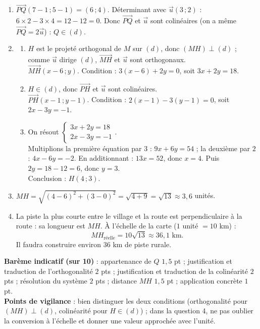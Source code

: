 \documentclass[11pt]{article}
\begin{document}
\begin{corrige}
\begin{enumerate}
\item $\overrightarrow{PQ}(7-1\,;5-1) = (6\,;4)$. Déterminant avec $\vec{u}(3\,;2)$ : $6\times 2 - 3\times 4 = 12-12 = 0$. Donc $\overrightarrow{PQ}$ et $\vec{u}$ sont colinéaires (on a même $\overrightarrow{PQ} = 2\vec{u}$) : $Q\in(d)$.
\item \begin{enumerate}
\item $H$ est le projeté orthogonal de $M$ sur $(d)$, donc $(MH)\perp(d)$ ; comme $\vec{u}$ dirige $(d)$, $\overrightarrow{MH}$ et $\vec{u}$ sont orthogonaux.\\
$\overrightarrow{MH}(x-6\,;y)$. Condition : $3(x-6)+2y = 0$, soit $3x+2y = 18$.
\item $H\in(d)$, donc $\overrightarrow{PH}$ et $\vec{u}$ sont colinéaires.\\
$\overrightarrow{PH}(x-1\,;y-1)$. Condition : $2(x-1)-3(y-1) = 0$, soit $2x-3y = -1$.
\item On résout $\begin{cases} 3x+2y = 18 \\ 2x-3y = -1 \end{cases}$.\\
Multiplions la première équation par $3$ : $9x+6y = 54$ ; la deuxième par $2$ : $4x-6y = -2$. En additionnant : $13x = 52$, donc $x = 4$. Puis $2y = 18-12 = 6$, donc $y = 3$.\\
Conclusion : $H(4\,;3)$.
\end{enumerate}
\item $MH = \sqrt{(4-6)^2+(3-0)^2} = \sqrt{4+9} = \sqrt{13} \approx 3,6$ unités.
\item La piste la plus courte entre le village et la route est perpendiculaire à la route : sa longueur est $MH$. À l'échelle de la carte ($1$ unité $= 10$ km) :
\[ MH_{\text{réelle}} = 10\sqrt{13} \approx 36,1 \text{ km.} \]
Il faudra construire environ $36$ km de piste rurale.
\end{enumerate}
\textbf{Barème indicatif (sur 10)} : appartenance de $Q$ $1,5$ pt ; justification et traduction de l'orthogonalité $2$ pts ; justification et traduction de la colinéarité $2$ pts ; résolution du système $2$ pts ; distance $MH$ $1,5$ pt ; application concrète $1$ pt.\\
\textbf{Points de vigilance} : bien distinguer les deux conditions (orthogonalité pour $(MH)\perp(d)$, colinéarité pour $H\in(d)$) ; dans la question 4, ne pas oublier la conversion à l'échelle et donner une valeur approchée avec l'unité.
\end{corrige}
\end{document}
